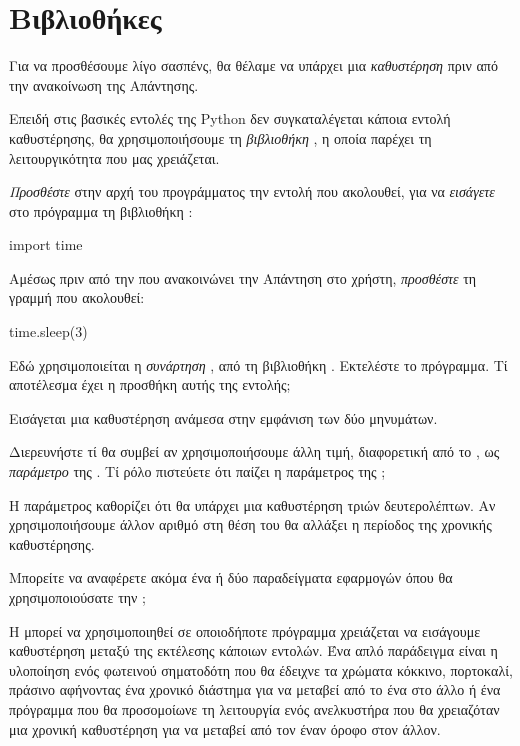 \documentclass[a4paper,11pt,oneside]{book}
\begin{document}
\section{Βιβλιοθήκες}

Για να προσθέσουμε λίγο σασπένς, θα θέλαμε να υπάρχει μια \emph{καθυστέρηση} πριν από την ανακοίνωση της Απάντησης. 

Επειδή στις βασικές εντολές της Python δεν συγκαταλέγεται κάποια εντολή καθυστέρησης, θα χρησιμοποιήσουμε τη \emph{βιβλιοθήκη} , η οποία παρέχει τη λειτουργικότητα που μας χρειάζεται. 

\begin{step}
\emph{Προσθέστε} στην αρχή του προγράμματος την εντολή που ακολουθεί, για να \emph{εισάγετε} στο πρόγραμμα τη βιβλιοθήκη :

\begin{pynew}
import time
\end{pynew}

Αμέσως πριν από την  που ανακοινώνει την Απάντηση στο χρήστη, \emph{προσθέστε} τη γραμμή που ακολουθεί:

\begin{pynew}
time.sleep(3)
\end{pynew}

Εδώ χρησιμοποιείται η \emph{συνάρτηση} , από τη βιβλιοθήκη . Εκτελέστε το πρόγραμμα. Τί αποτέλεσμα έχει η προσθήκη αυτής της εντολής;

\begin{answer}
Εισάγεται μια καθυστέρηση ανάμεσα στην εμφάνιση των δύο μηνυμάτων.
\end{answer}

Διερευνήστε τί θα συμβεί αν χρησιμοποιήσουμε άλλη τιμή, διαφορετική από το , ως \emph{παράμετρο} της . Tί ρόλο πιστεύετε ότι παίζει η παράμετρος της ;

\begin{answer}
Η παράμετρος  καθορίζει ότι θα υπάρχει μια καθυστέρηση τριών δευτερολέπτων. Αν χρησιμοποιήσουμε άλλον αριθμό στη θέση του  θα αλλάξει η περίοδος της χρονικής καθυστέρησης.
\end{answer}

Μπορείτε να αναφέρετε ακόμα ένα ή δύο παραδείγματα εφαρμογών όπου θα χρησιμοποιούσατε την ;

\begin{answer}
Η  μπορεί να χρησιμοποιηθεί σε οποιοδήποτε πρόγραμμα χρειάζεται να εισάγουμε καθυστέρηση μεταξύ της εκτέλεσης κάποιων εντολών. Ένα απλό παράδειγμα είναι η υλοποίηση ενός φωτεινού σηματοδότη που θα έδειχνε τα χρώματα κόκκινο, πορτοκαλί, πράσινο αφήνοντας ένα χρονικό διάστημα για να μεταβεί από το ένα στο άλλο ή ένα πρόγραμμα που θα προσομοίωνε τη λειτουργία ενός ανελκυστήρα που θα χρειαζόταν μια χρονική καθυστέρηση για να μεταβεί από τον έναν όροφο στον άλλον.
\end{answer}
\end{step}
\end{document}
